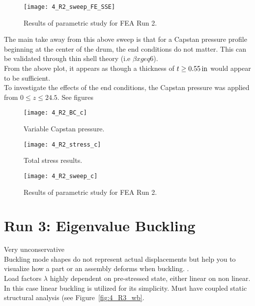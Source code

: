 \begin{figure}[H]
	\centering
	\texttt{[image: 4\_R2\_sweep\_FE\_SSE]}
	\caption{Results of parametric study for FEA Run 2.}
	\label{fig:4_R2_sweep}
\end{figure}

The main take away from this above sweep is that for a Capstan pressure profile beginning at the center of the drum, the end conditions do not matter. This can be validated through thin shell theory (i.e $\beta x geq 6$).\\

From the above plot, it appears as though a thickness of $t \geq 0.55 \,\mathrm{in}$ would appear to be sufficient.\\

To investigate the effects of the end conditions, the Capstan pressure was applied from $0 \leq z \leq 24.5$. See figures 



\begin{figure}[H]
	\centering
	\texttt{[image: 4\_R2\_BC\_c]}
	\caption{Variable Capstan pressure.}
	\label{fig:4_R2_BC_c}
\end{figure}

\begin{figure}[H]
	\centering
	\texttt{[image: 4\_R2\_stress\_c]}
	\caption{Total stress results.}
	\label{fig:4_R2_stress_c}
\end{figure}


\begin{figure}[H]
	\centering
	\texttt{[image: 4\_R2\_sweep\_c]}
	\caption{Results of parametric study for FEA Run 2.}
	\label{fig:4_R2_sweep}
\end{figure}

\section{Run 3: Eigenvalue Buckling}
\label{section:4_R3}
Very unconservative \\

Buckling mode shapes do not represent actual displacements but help you to visualize how a part or an assembly deforms when buckling. \cite{ANSYS}. \\

Load factors $\lambda$ highly dependent on pre-stressed state, either linear on non linear.\\

In this case linear buckling is utilized for its simplicity. Must have coupled static structural analysis (see Figure~\ref{fig:4_R3_wb}.

